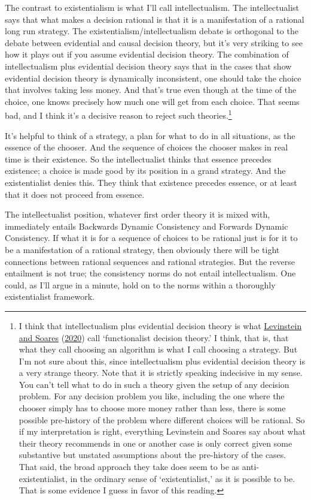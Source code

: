 \documentclass[
  12pt,
]{article}
\begin{document}
The contrast to existentialism is what I'll call intellectualism. The
intellectualist says that what makes a decision rational is that it is a
manifestation of a rational long run strategy. The
existentialism/intellectualism debate is orthogonal to the debate
between evidential and causal decision theory, but it's very striking to
see how it plays out if you assume evidential decision theory. The
combination of intellectualism plus evidential decision theory says that
in the cases that show evidential decision theory is dynamically
inconsistent, one should take the choice that involves taking less
money. And that's true even though at the time of the choice, one knows
precisely how much one will get from each choice. That seems bad, and I
think it's a decisive reason to reject such theories.\footnote{I think
  that intellectualism plus evidential decision theory is what
  \protect\hyperlink{ref-LevinsteinSoares2020}{Levinstein and Soares}
  (\protect\hyperlink{ref-LevinsteinSoares2020}{2020}) call
  `functionalist decision theory.' I think, that is, that what they call
  choosing an algorithm is what I call choosing a strategy. But I'm not
  sure about this, since intellectualism plus evidential decision theory
  is a very strange theory. Note that it is strictly speaking indecisive
  in my sense. You can't tell what to do in such a theory given the
  setup of any decision problem. For any decision problem you like,
  including the one where the chooser simply has to choose more money
  rather than less, there is some possible pre-history of the problem
  where different choices will be rational. So if my interpretation is
  right, everything Levinstein and Soares say about what their theory
  recommends in one or another case is only correct given some
  substantive but unstated assumptions about the pre-history of the
  cases. That said, the broad approach they take does seem to be as
  anti-existentialist, in the ordinary sense of `existentialist,' as it
  is possible to be. That is some evidence I guess in favor of this
  reading.}

It's helpful to think of a strategy, a plan for what to do in all
situations, as the essence of the chooser. And the sequence of choices
the chooser makes in real time is their existence. So the
intellectualist thinks that essence precedes existence; a choice is made
good by its position in a grand strategy. And the existentialist denies
this. They think that existence precedes essence, or at least that it
does not proceed from essence.

The intellectualist position, whatever first order theory it is mixed
with, immediately entails Backwards Dynamic Consistency and Forwards
Dynamic Consistency. If what it is for a sequence of choices to be
rational just is for it to be a manifestation of a rational strategy,
then obviously there will be tight connections between rational
sequences and rational strategies. But the reverse entailment is not
true; the consistency norms do not entail intellectualism. One could, as
I'll argue in a minute, hold on to the norms within a thoroughly
existentialist framework.
\end{document}
